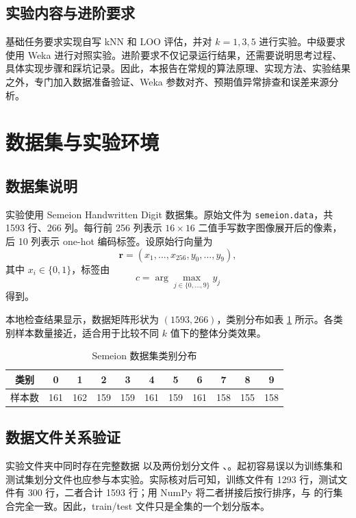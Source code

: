 \documentclass[UTF8,zihao=-4]{ctexart}
\begin{document}
\subsection{实验内容与进阶要求}

基础任务要求实现自写 kNN 和 LOO 评估，并对 $k=1,3,5$ 进行实验。中级要求使用 Weka 进行对照实验。进阶要求不仅记录运行结果，还需要说明思考过程、具体实现步骤和踩坑记录。因此，本报告在常规的算法原理、实现方法、实验结果之外，专门加入数据准备验证、Weka 参数对齐、预期值异常排查和误差来源分析。

\section{数据集与实验环境}

\subsection{数据集说明}

实验使用 Semeion Handwritten Digit 数据集。原始文件为 \texttt{semeion.data}，共 1593 行、266 列。每行前 256 列表示 $16 \times 16$ 二值手写数字图像展开后的像素，后 10 列表示 one-hot 编码标签。设原始行向量为
\[
  \mathbf{r} = (x_1,\ldots,x_{256}, y_0,\ldots,y_9),
\]
其中 $x_i \in \{0,1\}$，标签由
\[
  c = \arg\max_{j \in \{0,\ldots,9\}} y_j
\]
得到。

本地检查结果显示，数据矩阵形状为 $(1593,266)$，类别分布如表 \ref{tab:class-dist} 所示。各类别样本数量接近，适合用于比较不同 $k$ 值下的整体分类效果。

\begin{table}[H]
  \centering
  \caption{Semeion 数据集类别分布}
  \label{tab:class-dist}
  \begin{tabular}{ccccccccccc}
    \toprule
    类别 & 0 & 1 & 2 & 3 & 4 & 5 & 6 & 7 & 8 & 9 \\
    \midrule
    样本数 & 161 & 162 & 159 & 159 & 161 & 159 & 161 & 158 & 155 & 158 \\
    \bottomrule
  \end{tabular}
\end{table}

\subsection{数据文件关系验证}

实验文件夹中同时存在完整数据  以及两份划分文件 、。起初容易误以为训练集和测试集划分文件也应参与本实验。实际核对后可知，训练文件有 1293 行，测试文件有 300 行，二者合计 1593 行；用 NumPy 将二者拼接后按行排序，与  的行集合完全一致。因此，train/test 文件只是全集的一个划分版本。
\end{document}
